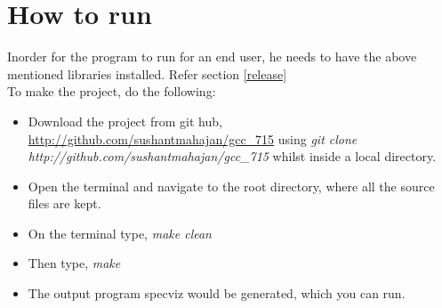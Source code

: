 \section{How to run}
\par{Inorder for the program to run for an end user, he needs to have the above mentioned libraries installed. Refer section \ref{release}}\\
To make the project, do the following:
\begin{itemize}
 \item Download the project from git hub, \url{http://github.com/sushantmahajan/gcc_715} using \newline \emph{git clone http://github.com/sushantmahajan/gcc\_715} whilst inside a local directory.
 \item Open the terminal and navigate to the root directory, where all the source files are kept.
 \item On the terminal type, \emph{make clean}
 \item Then type, \emph{make}
 \item The output program specviz would be generated, which you can run.
\end{itemize}

